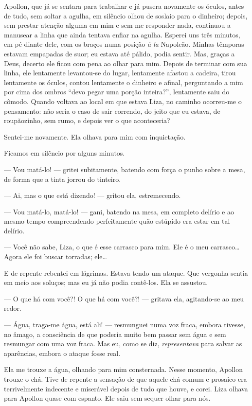 Apollon, que já se sentara para trabalhar e já pusera novamente os
óculos, antes de tudo, sem soltar a agulha, em silêncio olhou de
soslaio para o dinheiro; depois, sem prestar atenção alguma em mim e
sem me responder nada, continuou a manusear a linha que ainda tentava
enfiar na agulha. Esperei uns três minutos, em pé diante dele, com os
braços numa posição \textit{à la} Napoleão. Minhas
têmporas estavam empapadas de suor; eu estava até pálido, podia sentir.
Mas, graças a Deus, decerto ele ficou com pena ao olhar para mim.
Depois de terminar com sua linha, ele lentamente levantou-se do lugar,
lentamente afastou a cadeira, tirou lentamente os óculos, contou
lentamente o dinheiro e afinal, perguntando a mim por cima dos
ombros “devo pegar uma porção inteira?”, lentamente saiu do cômodo.
Quando voltava ao local em que estava Liza, no caminho ocorreu-me o
pensamento: não seria o caso de sair correndo, do jeito que eu estava,
de roupãozinho, sem rumo, e depois ver o que aconteceria?

Sentei-me novamente. Ela olhava para mim com inquietação.

Ficamos em silêncio por alguns minutos.

--- Vou matá-lo! --- gritei subitamente, batendo com força o punho sobre a
mesa, de forma que a tinta jorrou do tinteiro.

--- Ai, mas o que está dizendo! --- gritou ela, estremecendo.

--- Vou matá-lo, matá-lo! --- gani, batendo na mesa, em completo delírio e
ao mesmo tempo compreendendo perfeitamente quão estúpido era estar em
tal delírio.

--- Você não sabe, Liza, o que é esse carrasco para mim. Ele é o meu
carrasco\ldots{} Agora ele foi buscar torradas; ele\ldots{}

E de repente rebentei em lágrimas. Estava tendo um ataque. Que vergonha
sentia em meio aos soluços; mas eu já não podia contê-los. Ela se
assustou.

--- O que há com você?! O que há com você?! --- gritava ela, agitando-se ao
meu redor.

--- Água, traga-me água, está ali! --- resmunguei numa voz fraca, embora
tivesse, no âmago, a consciência de que poderia muito bem passar sem 
água e sem resmungar com uma voz fraca. Mas eu, como se diz,
\textit{representava} para salvar as aparências, embora o ataque fosse
real.

Ela me trouxe a água, olhando para mim consternada. Nesse momento,
Apollon trouxe o chá. Tive de repente a sensação de que aquele chá
comum e prosaico era terrivelmente indecente e miserável depois de tudo
que houve, e corei. Liza olhava para Apollon quase com espanto. Ele
saiu sem sequer olhar para nós.

